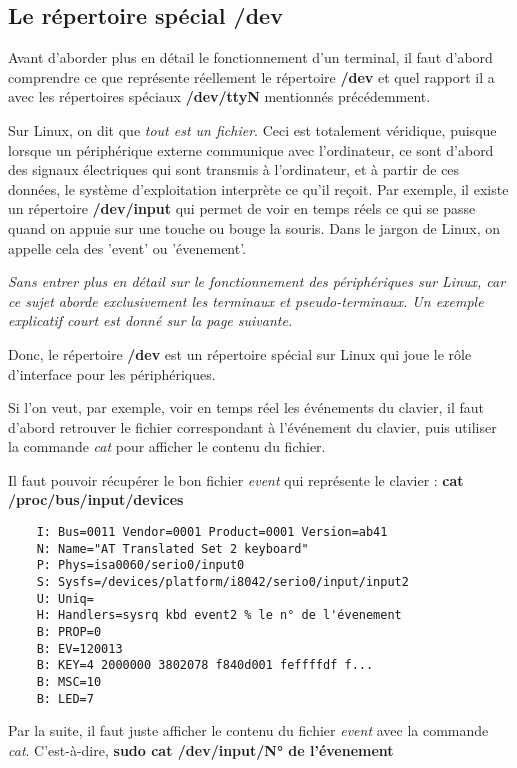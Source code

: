 \subsection{Le répertoire spécial /dev}
Avant d'aborder plus en détail le fonctionnement d'un terminal, il faut d'abord comprendre ce que représente réellement le répertoire \textbf{/dev} et quel rapport il a avec les répertoires spéciaux \textbf{/dev/ttyN} mentionnés précédemment.

Sur Linux, on dit que \textit{tout est un fichier}. Ceci est totalement véridique, puisque lorsque un périphérique externe communique avec l'ordinateur, ce sont d'abord des signaux électriques qui sont transmis à l'ordinateur, et à partir de ces données, le système d'exploitation interprète ce qu'il reçoit. Par exemple, il existe un répertoire \textbf{/dev/input} qui permet de voir en temps réels ce qui se passe quand on appuie sur une touche ou bouge la souris. Dans le jargon de Linux, on appelle cela des 'event' ou 'évenement'.

\textit{Sans entrer plus en détail sur le fonctionnement des périphériques sur Linux, car ce sujet aborde exclusivement les terminaux et pseudo-terminaux. Un exemple explicatif court est donné sur la page suivante.}

Donc, le répertoire \textbf{/dev} est un répertoire spécial sur Linux qui joue le rôle d'interface pour les périphériques.

\clearpage

\begin{tcolorbox}[title=Pour information]
    Si l'on veut, par exemple, voir en temps réel les événements du clavier, il faut d'abord retrouver le fichier correspondant à l'événement du clavier, puis utiliser la commande \textit{cat} pour afficher le contenu du fichier.
    
    Il faut pouvoir récupérer le bon fichier \textit{event} qui représente le clavier : \textbf{cat /proc/bus/input/devices}

    \begin{verbatim}
    I: Bus=0011 Vendor=0001 Product=0001 Version=ab41
    N: Name="AT Translated Set 2 keyboard"
    P: Phys=isa0060/serio0/input0
    S: Sysfs=/devices/platform/i8042/serio0/input/input2
    U: Uniq=
    H: Handlers=sysrq kbd event2 % le n° de l'évenement
    B: PROP=0
    B: EV=120013
    B: KEY=4 2000000 3802078 f840d001 feffffdf f...
    B: MSC=10
    B: LED=7
    \end{verbatim}

	Par la suite, il faut juste afficher le contenu du fichier \textit{event} avec la commande \textit{cat}.
	C'est-à-dire, \textbf{sudo cat /dev/input/{N° de l'évenement} }
\end{tcolorbox}

